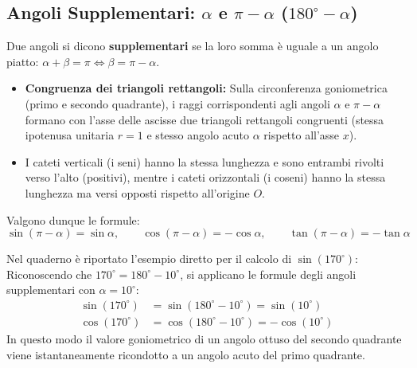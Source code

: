 \documentclass[11pt,a4paper,oneside]{report}
\begin{document}
\subsection{Angoli Supplementari: $\alpha$ e $\pi - \alpha$ ($180^\circ - \alpha$)}
Due angoli si dicono \textbf{supplementari} se la loro somma è uguale a un angolo piatto: $\alpha + \beta = \pi \iff \beta = \pi - \alpha$.
\begin{itemize}[leftmargin=*, label=\textbullet]
    \item \textbf{Congruenza dei triangoli rettangoli:} Sulla circonferenza goniometrica (primo e secondo quadrante), i raggi corrispondenti agli angoli $\alpha$ e $\pi - \alpha$ formano con l'asse delle ascisse due triangoli rettangoli congruenti (stessa ipotenusa unitaria $r = 1$ e stesso angolo acuto $\alpha$ rispetto all'asse $x$).
    \item I cateti verticali (i seni) hanno la stessa lunghezza e sono entrambi rivolti verso l'alto (positivi), mentre i cateti orizzontali (i coseni) hanno la stessa lunghezza ma versi opposti rispetto all'origine $O$.
\end{itemize}
Valgono dunque le formule:
\begin{equation}
    \sin(\pi - \alpha) = \sin\alpha, \qquad \cos(\pi - \alpha) = -\cos\alpha, \qquad \tan(\pi - \alpha) = -\tan\alpha
\end{equation}

\begin{esempio}
Nel quaderno è riportato l'esempio diretto per il calcolo di $\sin(170^\circ)$:
Riconoscendo che $170^\circ = 180^\circ - 10^\circ$, si applicano le formule degli angoli supplementari con $\alpha = 10^\circ$:
\begin{align}
    \sin(170^\circ) &= \sin(180^\circ - 10^\circ) = \sin(10^\circ) \\
    \cos(170^\circ) &= \cos(180^\circ - 10^\circ) = -\cos(10^\circ)
\end{align}
In questo modo il valore goniometrico di un angolo ottuso del secondo quadrante viene istantaneamente ricondotto a un angolo acuto del primo quadrante.
\end{esempio}
\end{document}
